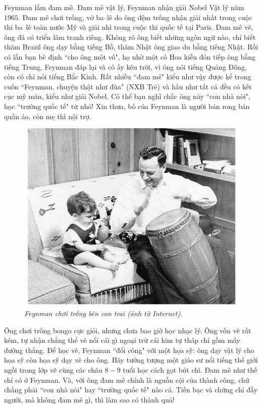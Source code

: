\begin{multicols}{2}
	Feynman lắm đam mê. Đam mê vật lý, Feynman nhận giải Nobel Vật lý năm $1965$. Đam mê chơi trống, vở ba--lê do ông đệm trống nhận giải nhất trong cuộc thi ba--lê toàn nước Mỹ và giải nhì trong cuộc thi quốc tế tại Paris. Đam mê vẽ, ông đã có triển lãm tranh riêng. Không rõ ông biết những ngôn ngữ nào, chỉ biết thăm Brazil ông dạy bằng tiếng Bồ, thăm Nhật ông giao du bằng tiếng Nhật. Rồi có lần bạn bè định ``cho ông một vố", họ nhờ một cô Hoa kiều đón tiếp ông bằng tiếng Trung, Feynman đáp lại và cô ấy kêu trời, vì ông nói tiếng Quảng Đông, còn cô chỉ nói tiếng Bắc Kinh. Rất nhiều ``đam mê" kiểu như vậy được kể trong cuốn ``Feynman, chuyện thật như đùa" (NXB Trẻ) và hầu như tất cả đều có kết cục mỹ mãn, kiểu như giải Nobel. Có thể bạn nghĩ chắc ông này ``con nhà nòi", học ``trường quốc tế" từ nhỏ! Xin thưa, bố của Feynman là người bán rong bán quần áo, còn mẹ thì nội trợ. 
	\begin{figure}[H]
		\vspace*{-5pt}
		\centering
		\captionsetup{labelformat= empty, justification=centering}
		\includegraphics[width= 1\linewidth]{2a}
		\caption{\small\textit{\color{quantoan}Feynman chơi trống bên con trai (ảnh từ Internet).}}
		\vspace*{-10pt}
	\end{figure}
	Ông chơi trống bongo cực giỏi, nhưng chưa bao giờ học nhạc lý. Ông vốn vẽ rất kém, tự nhận chẳng thể vẽ nổi cái gì ngoại trừ cái kim tự tháp chỉ gồm mấy đường thẳng. Để học vẽ, Feynman ``đổi công" với một họa sỹ: ông dạy vật lý cho họa sỹ còn họa sỹ dạy vẽ cho ông. Hãy tưởng tượng một giáo sư nổi tiếng thế giới ngồi trong lớp vẽ cùng các cháu $8-9$ tuổi học cách gọt bút chì. Đam mê như thế chỉ có ở Feynman. Và, với ông đam mê chính là nguồn cội của thành công, chứ chẳng phải ``con nhà nòi" hay ``trường quốc tế" nào cả. Tiền bạc và chứng chỉ đầy người, mà không đam mê gì, thì làm sao có thành quả! 

\end{multicols}
